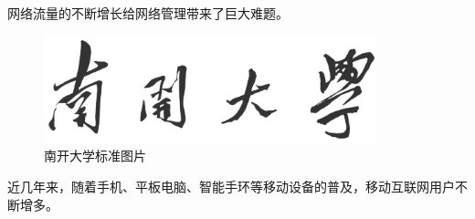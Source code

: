 网络流量的不断增长给网络管理带来了巨大难题。

\begin{figure}[htb]
\centering
\includegraphics[width=3.8in]{./figures/0/nankaidaxue}
\caption{南开大学标准图片}
\label{fig:11}
\end{figure}

近几年来，随着手机、平板电脑、智能手环等移动设备的普及\supercite{bahl2000radar}，移动互联网用户不断增多\supercite{monkey}。